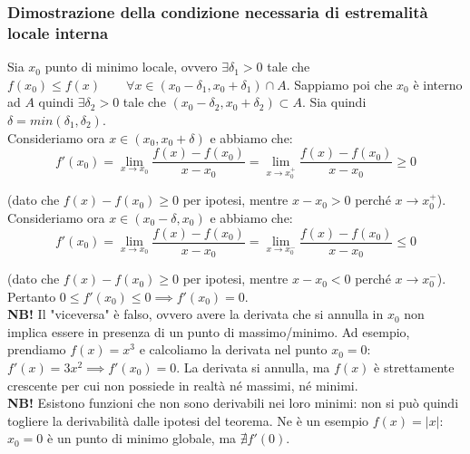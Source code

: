 \documentclass{article}
\begin{document}
\subsubsection{Dimostrazione della condizione necessaria di estremalità locale interna}
Sia $x_0$ punto di minimo locale, ovvero $\exists \delta_1 > 0$ tale che $f(x_0) \leq f(x) \qquad \forall x \in (x_0 - \delta_1, x_0 + \delta_1) \cap A$. Sappiamo poi che $x_0$ è interno ad $A$ quindi $\exists \delta_2 > 0$ tale che $(x_0 - \delta_2, x_0 + \delta_2) \subset A$. Sia quindi $\delta = min(\delta_1, \delta_2)$. \\
Consideriamo ora $x \in (x_0, x_0 + \delta)$ e abbiamo che:
\begin{equation*}
    f'(x_0) = \lim_{x \to x_0} \frac{f(x) - f(x_0)}{x - x_0} = \lim_{x \to x_0^+} \frac{f(x) - f(x_0)}{x - x_0} \geq 0
\end{equation*}

\noindent (dato che $f(x) - f(x_0) \geq 0$ per ipotesi, mentre $x - x_0 > 0$ perché $x \to x_0^+$).\\
Consideriamo ora $x \in (x_0 - \delta, x_0)$ e abbiamo che:
\begin{equation*}
    f'(x_0) = \lim_{x \to x_0} \frac{f(x) - f(x_0)}{x - x_0} = \lim_{x \to x_0^-} \frac{f(x) - f(x_0)}{x - x_0} \leq 0
\end{equation*}

\noindent (dato che $f(x) - f(x_0) \geq 0$ per ipotesi, mentre $x - x_0 < 0$ perché $x \to x_0^-$).\\
Pertanto $0 \leq f'(x_0) \leq 0 \implies f'(x_0) = 0$. \\

\noindent\textbf{NB!} Il "viceversa" è falso, ovvero avere la derivata che si annulla in $x_0$ non implica essere in presenza di un punto di massimo/minimo. Ad esempio, prendiamo $f(x) = x^3$ e calcoliamo la derivata nel punto $x_0 = 0$: $f'(x) = 3x^2 \implies f'(x_0) = 0$. La derivata si annulla, ma $f(x)$ è strettamente crescente per cui non possiede in realtà né massimi, né minimi.\\

\noindent\textbf{NB!} Esistono funzioni che non sono derivabili nei loro minimi: non si può quindi togliere la derivabilità dalle ipotesi del teorema. Ne è un esempio $f(x) = |x|$: $x_0 = 0$ è un punto di minimo globale, ma $\nexists f'(0)$.\\

\end{document}
